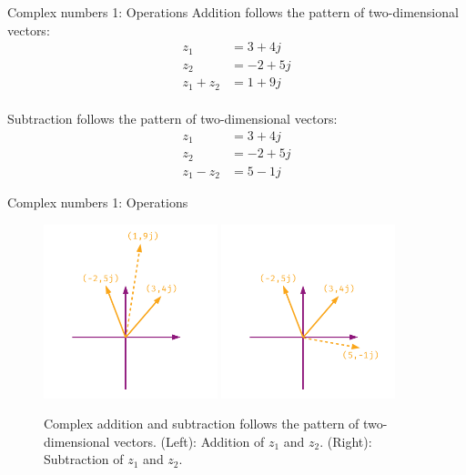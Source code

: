\documentclass{beamer}
\begin{document}
\begin{frame}{Complex numbers 1: Operations}
Addition follows the pattern of two-dimensional vectors:
\begin{align}
z_1 &= 3+4j \\
z_2 &= -2+5j \\
z_1 + z_2 &= 1+9j
\end{align} \\
Subtraction follows the pattern of two-dimensional vectors:
\begin{align}
z_1 &= 3+4j \\
z_2 &= -2+5j \\
z_1 - z_2 &= 5-1j
\end{align}
\end{frame}

\begin{frame}{Complex numbers 1: Operations}
\begin{figure}
\centering
\includegraphics[width=0.45\textwidth]{figures/complexNumbers1.pdf}
\includegraphics[width=0.45\textwidth]{figures/complexNumbers2.pdf}
\caption{\label{fig:complex1} Complex addition and subtraction follows the pattern of two-dimensional vectors. (Left): Addition of $z_1$ and $z_2$.  (Right): Subtraction of $z_1$ and $z_2$.}
\end{figure}
\end{frame}
\end{document}
